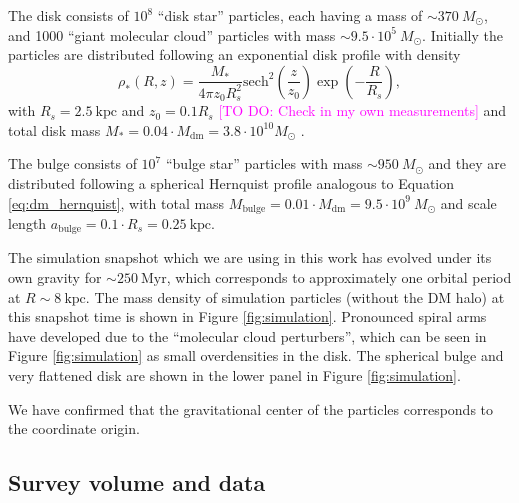 \documentclass[iop,revtex4,numberedappendix,appendixfloats]{emulateapj}
\newcommand{\Wilma}[1]{\textcolor{Magenta}{#1}}
\begin{document}
The disk consists of $10^8$ ``disk star'' particles, each having a mass of $\sim370 ~M_\odot$, and 1000 ``giant molecular cloud'' particles with mass $\sim9.5\cdot 10^{5} ~M_\odot$. Initially the particles are distributed following an exponential disk profile with density
\begin{equation*}
\rho_*(R,z) = \frac{M_*}{4\pi z_0 R_s^2} \text{sech}^2 \left( \frac{z}{z_0}\right) \exp \left(- \frac{R}{R_s} \right),
\end{equation*}
with $R_s = 2.5~\text{kpc}$ and $z_0=0.1R_s$ \Wilma{[TO DO: Check in my own measurements]} and total disk mass $M_* = 0.04\cdot M_\text{dm} = 3.8\cdot 10^{10} M_\odot$ .

The bulge consists of $10^7$ ``bulge star'' particles with mass $\sim950 ~M_\odot$ and they are distributed following a spherical Hernquist profile analogous to Equation \eqref{eq:dm_hernquist}, with total mass $M_\text{bulge}=0.01 \cdot M_\text{dm} = 9.5\cdot 10^9~M_\odot$ and scale length $a_\text{bulge}=0.1\cdot R_s=0.25~\text{kpc}$.

The simulation snapshot which we are using in this work has evolved under its own gravity for $\sim 250~\text{Myr}$, which corresponds to approximately one orbital period at $R\sim8~\text{kpc}$. The mass density of simulation particles (without the DM halo) at this snapshot time is shown in Figure \ref{fig:simulation}. Pronounced spiral arms have developed due to the ``molecular cloud perturbers'', which can be seen in Figure \ref{fig:simulation} as small overdensities in the disk. The spherical bulge and very flattened disk are shown in the lower panel in Figure \ref{fig:simulation}.

We have confirmed that the gravitational center of the particles corresponds to the coordinate origin.

\subsection{Survey volume and data}
\end{document}

